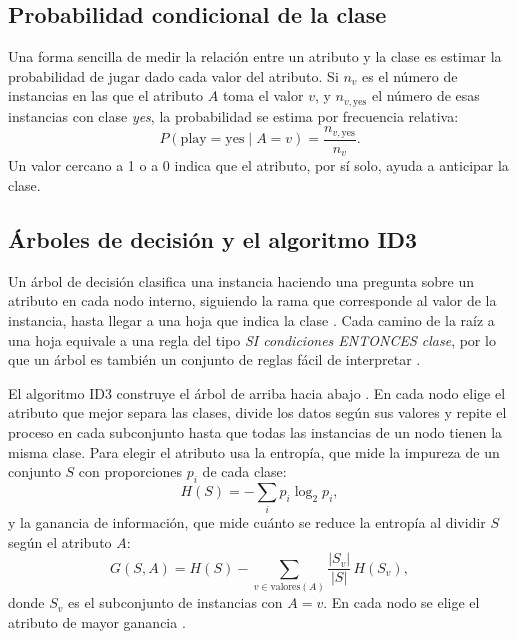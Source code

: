 \documentclass[11pt,letterpaper]{article}
\begin{document}
\subsection{Probabilidad condicional de la clase}

Una forma sencilla de medir la relación entre un atributo y la clase es estimar la probabilidad de jugar dado cada valor del atributo. Si $n_v$ es el número de instancias en las que el atributo $A$ toma el valor $v$, y $n_{v,\text{yes}}$ el número de esas instancias con clase \textit{yes}, la probabilidad se estima por frecuencia relativa:
\begin{equation}
    P(\text{play} = \text{yes} \mid A = v) = \frac{n_{v,\text{yes}}}{n_v}.
\end{equation}
Un valor cercano a 1 o a 0 indica que el atributo, por sí solo, ayuda a anticipar la clase.

\subsection{Árboles de decisión y el algoritmo ID3}

Un árbol de decisión clasifica una instancia haciendo una pregunta sobre un atributo en cada nodo interno, siguiendo la rama que corresponde al valor de la instancia, hasta llegar a una hoja que indica la clase \parencite{mitchell1997}. Cada camino de la raíz a una hoja equivale a una regla del tipo \textit{SI condiciones ENTONCES clase}, por lo que un árbol es también un conjunto de reglas fácil de interpretar \parencite{witten2017}.

El algoritmo ID3 construye el árbol de arriba hacia abajo \parencite{quinlan1986}. En cada nodo elige el atributo que mejor separa las clases, divide los datos según sus valores y repite el proceso en cada subconjunto hasta que todas las instancias de un nodo tienen la misma clase. Para elegir el atributo usa la entropía, que mide la impureza de un conjunto $S$ con proporciones $p_i$ de cada clase:
\begin{equation}
    H(S) = -\sum_{i} p_i \log_2 p_i,
\end{equation}
y la ganancia de información, que mide cuánto se reduce la entropía al dividir $S$ según el atributo $A$:
\begin{equation}
    G(S, A) = H(S) - \sum_{v \in \text{valores}(A)} \frac{|S_v|}{|S|}\, H(S_v),
\end{equation}
donde $S_v$ es el subconjunto de instancias con $A = v$. En cada nodo se elige el atributo de mayor ganancia \parencite{mitchell1997}.
\end{document}
